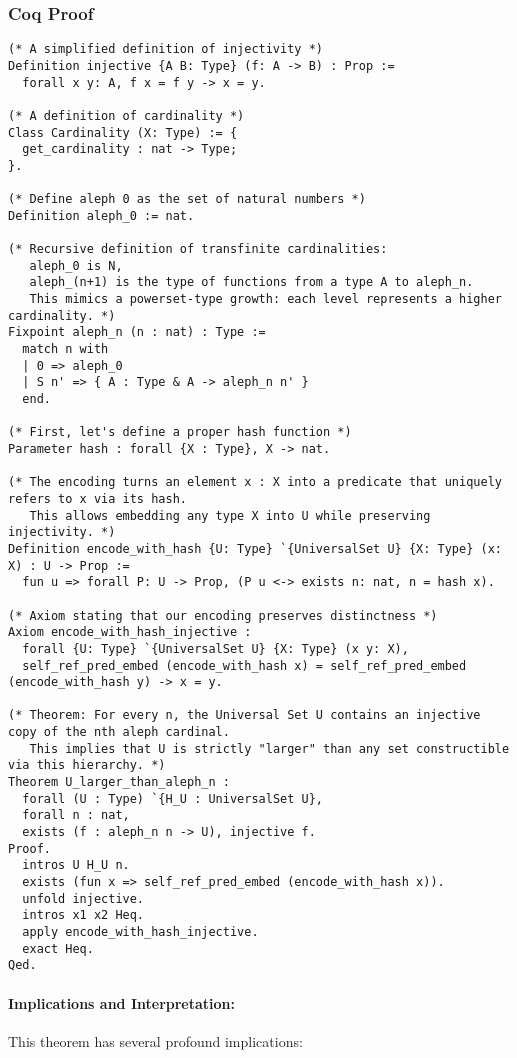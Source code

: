 \documentclass[12pt]{article}
\begin{document}
\subsubsection{Coq Proof}
\begin{lstlisting}[language=Coq]
(* A simplified definition of injectivity *)
Definition injective {A B: Type} (f: A -> B) : Prop :=
  forall x y: A, f x = f y -> x = y.

(* A definition of cardinality *)
Class Cardinality (X: Type) := {
  get_cardinality : nat -> Type;
}.

(* Define aleph 0 as the set of natural numbers *)
Definition aleph_0 := nat.

(* Recursive definition of transfinite cardinalities:
   aleph_0 is N,
   aleph_(n+1) is the type of functions from a type A to aleph_n.
   This mimics a powerset-type growth: each level represents a higher cardinality. *)
Fixpoint aleph_n (n : nat) : Type :=
  match n with
  | 0 => aleph_0
  | S n' => { A : Type & A -> aleph_n n' }
  end.

(* First, let's define a proper hash function *)
Parameter hash : forall {X : Type}, X -> nat.

(* The encoding turns an element x : X into a predicate that uniquely refers to x via its hash.
   This allows embedding any type X into U while preserving injectivity. *)
Definition encode_with_hash {U: Type} `{UniversalSet U} {X: Type} (x: X) : U -> Prop :=
  fun u => forall P: U -> Prop, (P u <-> exists n: nat, n = hash x).

(* Axiom stating that our encoding preserves distinctness *)
Axiom encode_with_hash_injective : 
  forall {U: Type} `{UniversalSet U} {X: Type} (x y: X),
  self_ref_pred_embed (encode_with_hash x) = self_ref_pred_embed (encode_with_hash y) -> x = y.

(* Theorem: For every n, the Universal Set U contains an injective copy of the nth aleph cardinal.
   This implies that U is strictly "larger" than any set constructible via this hierarchy. *)
Theorem U_larger_than_aleph_n :
  forall (U : Type) `{H_U : UniversalSet U},
  forall n : nat,
  exists (f : aleph_n n -> U), injective f.
Proof.
  intros U H_U n.
  exists (fun x => self_ref_pred_embed (encode_with_hash x)).
  unfold injective.
  intros x1 x2 Heq.
  apply encode_with_hash_injective.
  exact Heq.
Qed.
\end{lstlisting}

\paragraph{Implications and Interpretation:}
This theorem has several profound implications:
\end{document}
